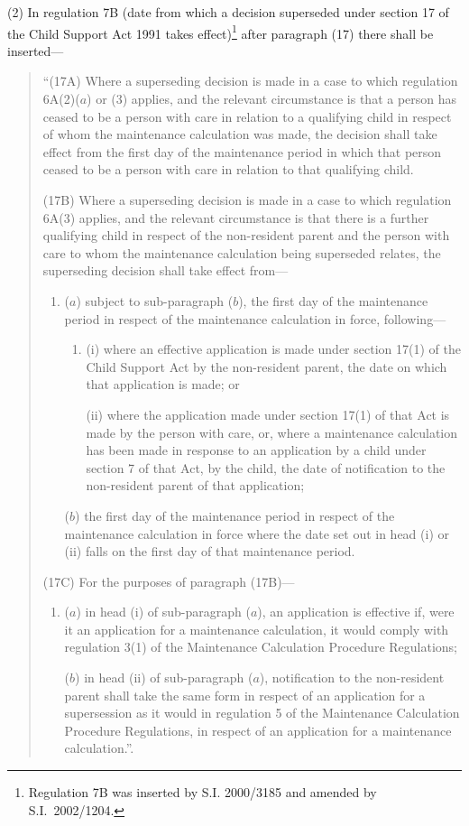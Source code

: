 \documentclass[12pt,a4paper]{article}
\begin{document}
(2) In regulation 7B (date from which a decision superseded under section 17 of the Child Support Act 1991 takes effect)\footnote{Regulation 7B was inserted by S.I. 2000/3185 and amended by S.I.\ 2002/1204.} after paragraph (17) there shall be inserted—
\begin{quotation}
“(17A) Where a superseding decision is made in a case to which regulation 6A(2)($a$)  or (3) applies, and the relevant circumstance is that a person has ceased to be a person with care in relation to a qualifying child in respect of whom the maintenance calculation was made, the decision shall take effect from the first day of the maintenance period in which that person ceased to be a person with care in relation to that qualifying child.

(17B) Where a superseding decision is made in a case to which regulation 6A(3) applies, and the relevant circumstance is that there is a further qualifying child in respect of the non-resident parent and the person with care to whom the maintenance calculation being superseded relates, the superseding decision shall take effect from—
\begin{enumerate}\item[]
($a$) subject to sub-paragraph ($b$), the first day of the maintenance period in respect of the maintenance calculation in force, following—
\begin{enumerate}\item[]
(i) where an effective application is made under section 17(1) of the Child Support Act by the non-resident parent, the date on which that application is made; or

(ii) where the application made under section 17(1) of that Act is made by the person with care, or, where a maintenance calculation has been made in response to an application by a child under section 7 of that Act, by the child, the date of notification to the non-resident parent of that application;
\end{enumerate}

($b$) the first day of the maintenance period in respect of the maintenance calculation in force where the date set out in head (i)  or (ii)  falls on the first day of that maintenance period.
\end{enumerate}

(17C) For the purposes of paragraph (17B)—
\begin{enumerate}\item[]
($a$) in head (i)  of sub-paragraph ($a$), an application is effective if, were it an application for a maintenance calculation, it would comply with regulation 3(1) of the Maintenance Calculation Procedure Regulations;

($b$) in head (ii)  of sub-paragraph ($a$), notification to the non-resident parent shall take the same form in respect of an application for a supersession as it would in regulation 5 of the Maintenance Calculation Procedure Regulations, in respect of an application for a maintenance calculation.”.
\end{enumerate}
\end{quotation}
\end{document}
